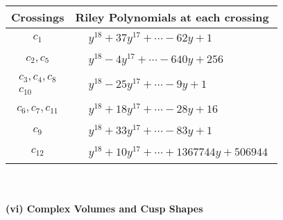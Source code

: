 \documentclass[1p]{elsarticle_modified}
\theoremstyle{definition}
\begin{document}
\begin{tabular}{m{50pt}|m{274pt}}
Crossings & \hspace{64pt}Riley Polynomials at each crossing \\
\hline $$\begin{aligned}c_{1}\end{aligned}$$&$\begin{aligned}
&y^{18}+37 y^{17}+\cdots-62 y+1
\end{aligned}$\\
\hline $$\begin{aligned}c_{2},c_{5}\end{aligned}$$&$\begin{aligned}
&y^{18}-4 y^{17}+\cdots-640 y+256
\end{aligned}$\\
\hline $$\begin{aligned}c_{3},c_{4},c_{8}\\c_{10}\end{aligned}$$&$\begin{aligned}
&y^{18}-25 y^{17}+\cdots-9 y+1
\end{aligned}$\\
\hline $$\begin{aligned}c_{6},c_{7},c_{11}\end{aligned}$$&$\begin{aligned}
&y^{18}+18 y^{17}+\cdots-28 y+16
\end{aligned}$\\
\hline $$\begin{aligned}c_{9}\end{aligned}$$&$\begin{aligned}
&y^{18}+33 y^{17}+\cdots-83 y+1
\end{aligned}$\\
\hline $$\begin{aligned}c_{12}\end{aligned}$$&$\begin{aligned}
&y^{18}+10 y^{17}+\cdots+1367744 y+506944
\end{aligned}$\\
\hline
\end{tabular}\\~\\
\newpage\flushleft \textbf{(vi) Complex Volumes and Cusp Shapes}
\end{document}
